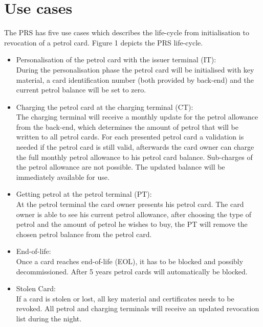 
\section{Use cases}
The PRS has five use cases which describes the life-cycle from initialisation to revocation of a petrol card. Figure 1 depicts the PRS life-cycle. 

\begin{itemize}
\item Personalisation of the petrol card with the issuer terminal (IT):\\
During the personalisation phase the petrol card will be initialised with key material, a card identification number (both provided by back-end) and the current petrol balance will be set to zero. 

\item Charging the petrol card at the charging terminal (CT): \\
The charging terminal will receive a monthly update for the petrol allowance from the back-end, which determines the amount of petrol that will be written to all petrol cards. For each presented petrol card a validation is needed if the petrol card is still valid, afterwards the card owner can charge the full monthly petrol allowance to his petrol card balance. Sub-charges of the petrol allowance are not possible. The updated balance will be immediately available for use. 

\item Getting petrol at the petrol terminal (PT):\\
At the petrol terminal the card owner presents his petrol card. The card owner is able to see his current petrol allowance, after choosing the type of petrol and the amount of petrol he wishes to buy, the PT will remove the chosen petrol balance from the petrol card. %

\item End-of-life: \\
Once a card reaches end-of-life (EOL), it has to be blocked and possibly decommissioned. After 5 years petrol cards will automatically be blocked.

\item Stolen Card: \\
If a card is stolen or lost, all key material and certificates needs to be revoked. All petrol and charging terminals will receive an updated revocation list during the night. 


\end{itemize}
